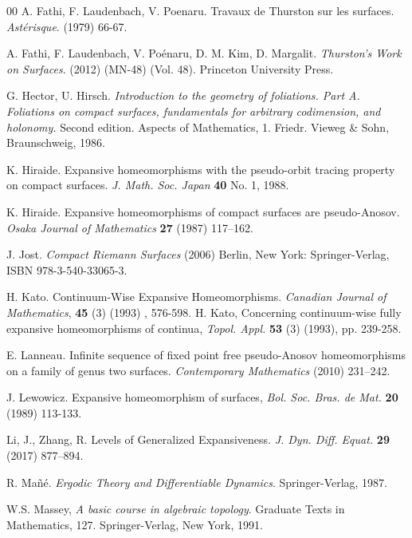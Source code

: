 \documentclass{amsart}
\theoremstyle{plain}
\theoremstyle{definition}
\begin{document}
\begin{thebibliography}{00}
 A. Fathi, F. Laudenbach, V. Poenaru. Travaux de Thurston sur les surfaces. \emph{Ast\'erisque}. (1979) 66-67. %

 A. Fathi, F. Laudenbach, V. Poénaru, D. M. Kim, D. Margalit. \emph{Thurston’s Work on Surfaces}. (2012) (MN-48) (Vol. 48). Princeton University Press.


 G. Hector, U. Hirsch. \textit{Introduction to the geometry of foliations. Part A. Foliations on compact surfaces, fundamentals for arbitrary codimension, and holonomy.} Second edition. Aspects of Mathematics, 1. Friedr. Vieweg \& Sohn, Braunschweig, 1986. 

 K. Hiraide. Expansive homeomorphisms with the pseudo-orbit tracing property on compact surfaces. \emph{J. Math. Soc. Japan} \textbf{40} No. 1, 1988.

 K. Hiraide. Expansive homeomorphisms of compact surfaces are pseudo-Anosov. \emph{Osaka
Journal of Mathematics} \textbf{27} (1987) 117–162.

 J. Jost. \emph{Compact Riemann Surfaces} (2006) Berlin, New York: Springer-Verlag, ISBN 978-3-540-33065-3.

 H. Kato.  Continuum-Wise Expansive Homeomorphisms. \emph{Canadian Journal of Mathematics}, \textbf{45} (3) (1993) , 576-598.
%
H. Kato, Concerning continuum-wise fully expansive homeomorphisms of continua, \emph{Topol. Appl.} \textbf{53} (3) (1993), pp. 239-258.

 E. Lanneau. Infinite sequence of fixed point free pseudo-Anosov homeomorphisms on a family of genus two surfaces. \emph{Contemporary Mathematics} (2010) 231–242.

 J. Lewowicz. Expansive homeomorphism of surfaces, \emph{Bol. Soc. Bras. de Mat.} \textbf{20} (1989) 113-133.

 Li, J., Zhang, R. Levels of Generalized Expansiveness. \emph{J. Dyn. Diff. Equat.} \textbf{29} (2017) 877–894.

 R. Mañé. \emph{Ergodic Theory and Differentiable Dynamics}. Springer-Verlag, 1987.

 W.S. Massey, \textit{A basic course in algebraic topology}. Graduate Texts in Mathematics, 127. Springer-Verlag, New York, 1991.


\end{thebibliography}
\end{document}
